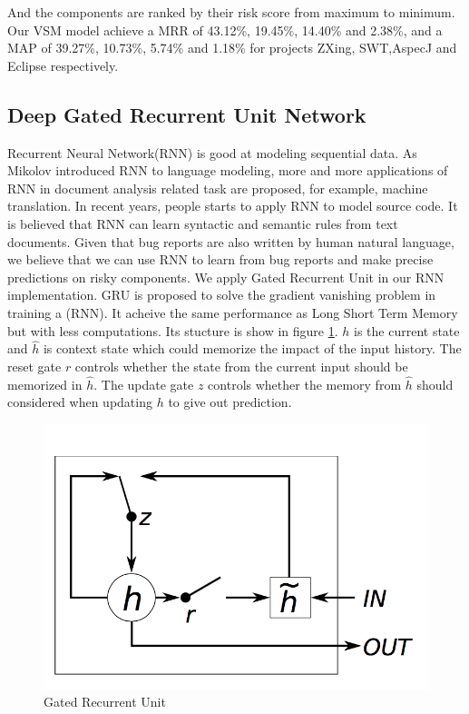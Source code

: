 And the components are ranked by their risk score from maximum to minimum.
Our VSM model achieve a MRR of 43.12\%, 19.45\%, 14.40\% and 2.38\%, and a MAP of 39.27\%, 10.73\%, 5.74\% and 1.18\%  for projects ZXing, SWT,AspecJ and Eclipse respectively. 





\subsection{Deep Gated Recurrent Unit Network}
Recurrent Neural Network(RNN) is good at modeling sequential data. 
As Mikolov introduced RNN to language modeling\cite{mikolov2010recurrent}, more and more applications of RNN in document analysis related task are proposed, for example, machine translation. 
In recent years, people starts to apply RNN to model source code\cite{raychev2014code}. 
It is believed that RNN can learn syntactic and semantic rules from text documents.
Given that bug reports are also written by human natural language, we believe that we can use RNN to learn from bug reports and make precise predictions on risky components.
We apply Gated Recurrent Unit in our RNN implementation.
GRU is proposed to solve the gradient vanishing problem in training a (RNN)\cite{chung2014empirical}.
It acheive the same performance as Long Short Term Memory but with less computations.
Its stucture is show in figure \ref{gru}. $h$ is the current state and $\hat{h}$ is context state which could memorize the impact of the input history. 
The reset gate $r$ controls whether the state from the current input should be memorized in $\hat{h}$.
The update gate $z$ controls whether the memory from $\hat{h}$ should considered when updating $h$ to give out prediction.  
\begin{figure}
	\includegraphics[scale=0.5]{gru.png}
	\caption{Gated Recurrent Unit\cite{chung2014empirical}}
	\label{gru}
\end{figure}

